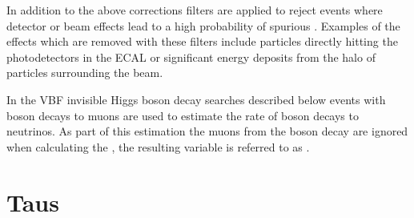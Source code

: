 In addition to the above corrections filters are applied to reject events where detector or beam effects lead to a high probability of spurious \MET. Examples of the effects which are removed with these filters include particles directly hitting the photodetectors in the \ac{ECAL} or significant energy deposits from the halo of particles surrounding the \LHC beam.

In the \ac{VBF} invisible Higgs boson decay searches described below events with \PZ boson decays to muons are used to estimate the rate of \PZ boson decays to neutrinos. As part of this estimation the muons from the \PZ boson decay are ignored when calculating the \MET, the resulting variable is referred to as \METnoMU.
\section{Taus}
\label{sec:taus}
